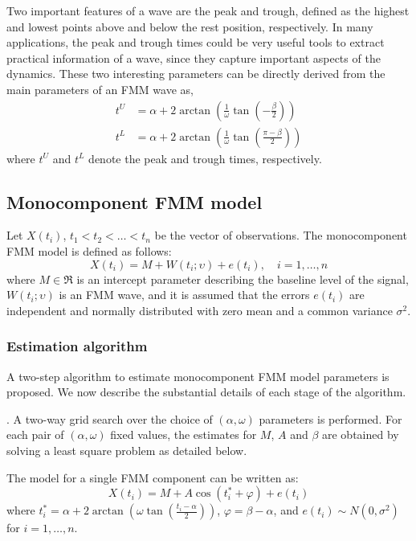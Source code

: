 Two important features of a wave are the peak and trough, defined as the highest and lowest points above and below the rest position, respectively. In many applications, the peak and trough times could be very useful tools to extract practical information of a wave, since they capture important aspects of the dynamics. These two interesting parameters can be directly derived from the main parameters of an FMM wave as,
%
\begin{align} \label{eq:monoFMM:fiducial}
  t^U & =  \alpha + 2\arctan\left(\frac{1}{\omega}\tan\left(-\frac{\beta}{2}\right)\right) \\
  t^L & = \alpha + 2\arctan\left(\frac{1}{\omega}\tan\left(\frac{\pi-\beta}{2}\right)\right) \nonumber
\end{align}
%
where $t^U$ and $t^L$ denote the peak and trough times, respectively. 

\subsection{Monocomponent FMM model} \label{subsec:monoFMM}
Let $X\left(t_i\right)$, $t_1 < t_2 < \dots < t_n$ be the vector of observations.
The monocomponent FMM model is defined as follows:
%
\begin{equation} \label{eq:monoFMM}
  X\left(t_i\right) = M + W\left(t_i; \upsilon\right) + e\left(t_i\right), \quad i = 1,\dots,n 
\end{equation} 
%
where $M \in \Re$ is an intercept parameter describing the baseline level of the signal, $W\left(t_i; \upsilon\right)$ is an FMM wave, and it is assumed that the errors $e\left(t_i\right)$ are independent and normally distributed with zero mean and a common variance $\sigma^2$.

\subsubsection{Estimation algorithm} \label{subsubsec:monoFMM:estimation}
A two-step algorithm to estimate monocomponent FMM model parameters is proposed. We now describe the substantial details of each stage of the algorithm.    

.
A two-way grid search over the choice of $\left(\alpha , \omega\right)$ parameters is performed. For each pair of $\left(\alpha , \omega\right)$ fixed values, the estimates for $M$, $A$ and $\beta$ are obtained by solving a least square problem as detailed below. 

The model for a single FMM component can be written as:
% 
\begin{equation} \label{eq:monoFMM:muiParam}
  X\left(t_i\right) = M + A\cos\left(t_{i}^{*} + \varphi\right)+ e\left(t_i\right)  
\end{equation}
%
where $t_{i}^{*} = \alpha + 2\arctan\left(\omega \tan\left(\frac{t_i - \alpha}{2}\right)\right)$,  $\varphi = \beta - \alpha$, and $e\left(t_i\right) \sim N\left(0, \sigma^2\right)$ for $i = 1, \dots, n$.

